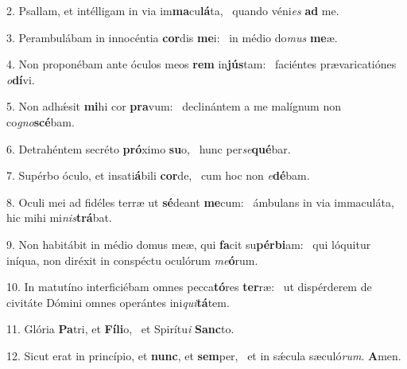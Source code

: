 2. Psallam, et intélligam in via im\textbf{ma}cu\textbf{lá}ta, \ast\  quando véni\textit{es} \textbf{ad} me.\

3. Perambulábam in innocéntia \textbf{cor}dis \textbf{me}i: \ast\  in médio do\textit{mus} \textbf{me}æ.\

4. Non proponébam ante óculos meos \textbf{rem} in\textbf{jús}tam: \ast\  faciéntes prævaricatiónes \textit{o}\textbf{dí}vi.\

5. Non adhǽsit \textbf{mi}hi cor \textbf{pra}vum: \ast\  declinántem a me malígnum non co\textit{gno}\textbf{scé}bam.\

6. Detrahéntem secréto \textbf{pró}ximo \textbf{su}o, \ast\  hunc per\textit{se}\textbf{qué}bar.\

7. Supérbo óculo, et insati\textbf{á}bili \textbf{cor}de, \ast\  cum hoc non \textit{e}\textbf{dé}bam.\

8. Oculi mei ad fidéles terræ ut \textbf{sé}deant \textbf{me}cum: \ast\  ámbulans in via immaculáta, hic mihi mi\textit{nis}\textbf{trá}bat.\

9. Non habitábit in médio domus meæ, qui \textbf{fa}cit su\textbf{pér}\textbf{bi}am: \ast\  qui lóquitur iníqua, non diréxit in conspéctu oculórum \textit{me}\textbf{ó}rum.\

10. In matutíno interficiébam omnes pecca\textbf{tó}res \textbf{ter}ræ: \ast\  ut dispérderem de civitáte Dómini omnes operántes ini\textit{qui}\textbf{tá}tem.\

11. Glória \textbf{Pa}tri, et \textbf{Fí}\textbf{li}o, \ast\  et Spirítu\textit{i} \textbf{Sanc}to.\

12. Sicut erat in princípio, et \textbf{nunc}, et \textbf{sem}per, \ast\  et in sǽcula sæculó\textit{rum}. \textbf{A}men.\

